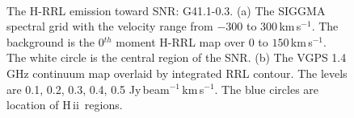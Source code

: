 \documentclass[manuscript]{aastex61}
\newcommand{\hii}{{\rm H\,}{{\sc ii}}}
\newcommand{\kms}{\,km\,s$^{-1}$}
\begin{document}
\begin{figure}[H]
	\centering
	\\
	\caption{The H-RRL emission toward SNR: G41.1-0.3.
	(a) The SIGGMA spectral grid with the velocity range from $-300$ to $300$\kms.
	The background is the 0$^{th}$ moment H-RRL map over $0$ to $150$\kms.
	The white circle is the central region of the SNR.
	(b) The VGPS 1.4 GHz continuum map overlaid by integrated RRL contour.
	The levels are 0.1, 0.2, 0.3, 0.4, 0.5 Jy\,beam$^{-1}$\kms.
	The blue circles are location of \hii\ regions.
	}
	\label{fig_snr-g411}
\end{figure}
\end{document}
